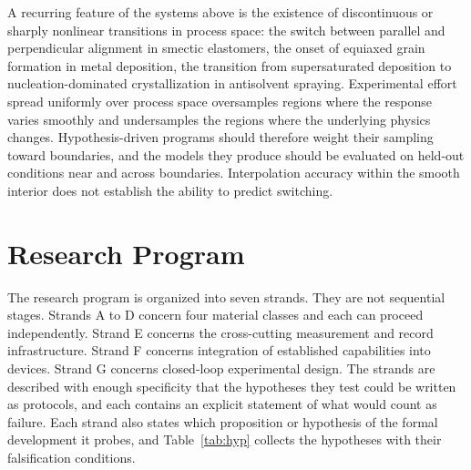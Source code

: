 \documentclass[11pt]{article}
\theoremstyle{definition}
\begin{document}
A recurring feature of the systems above is the existence of discontinuous or sharply nonlinear transitions in process space: the switch between parallel and perpendicular alignment in smectic elastomers, the onset of equiaxed grain formation in metal deposition, the transition from supersaturated deposition to nucleation-dominated crystallization in antisolvent spraying. Experimental effort spread uniformly over process space oversamples regions where the response varies smoothly and undersamples the regions where the underlying physics changes. Hypothesis-driven programs should therefore weight their sampling toward boundaries, and the models they produce should be evaluated on held-out conditions near and across boundaries. Interpolation accuracy within the smooth interior does not establish the ability to predict switching.

\section{Research Program}

The research program is organized into seven strands. They are not sequential stages. Strands A to D concern four material classes and each can proceed independently. Strand E concerns the cross-cutting measurement and record infrastructure. Strand F concerns integration of established capabilities into devices. Strand G concerns closed-loop experimental design. The strands are described with enough specificity that the hypotheses they test could be written as protocols, and each contains an explicit statement of what would count as failure. Each strand also states which proposition or hypothesis of the formal development it probes, and Table~\ref{tab:hyp} collects the hypotheses with their falsification conditions.
\end{document}
